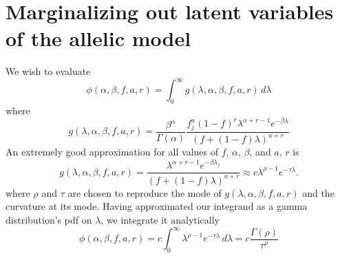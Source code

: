 \documentclass[nofootinbib,amssymb,amsmath]{revtex4}
\begin{document}
\section{Marginalizing out latent variables of the allelic model} \label{marginalizing}
We wish to evaluate
%
\begin{equation}
\phi(\alpha, \beta, f, a, r) = \int_0^\infty g(\lambda, \alpha, \beta, f, a, r) \, d \lambda 
\end{equation}
%
where
%
\begin{equation}
g(\lambda, \alpha, \beta, f, a, r) =  \frac{\beta^\alpha}{\Gamma(\alpha)}  \frac{ f_j^{a} (1 - f)^{r}  \lambda^{\alpha + r - 1} e^{-\beta \lambda}}{ \left( f + (1-f) \lambda \right)^{a+r}} 
\end{equation}
%
An extremely good approximation for all values of $f$, $\alpha$, $\beta$, and $a, \, r$ is
\begin{equation}
g(\lambda, \alpha, \beta, f, a, r) = \frac{\lambda^{\alpha + r - 1} e^{-\beta \lambda_j}}{ \left( f + (1-f) \lambda \right)^{a+r}} \approx c \lambda^{\rho - 1} e^{-\tau \lambda}.
\end{equation}
where $\rho$ and $\tau$ are chosen to reproduce the mode of $g(\lambda, \alpha, \beta, f, a, r)$ and the curvature at its mode.  Having approximated our integrand as a gamma distribution's pdf on $\lambda$, we integrate it analytically
%
\begin{equation}
\phi(\alpha, \beta, f, a, r) = c \int_0^\infty \lambda^{\rho - 1} e^{-\tau \lambda} \, d \lambda = c \frac{\Gamma(\rho)}{\tau^\rho}
\end{equation}
%
\end{document}
